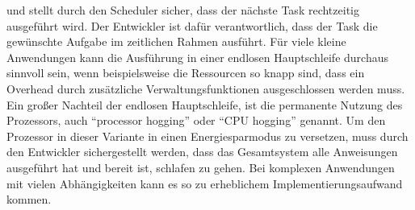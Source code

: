 und stellt durch den Scheduler sicher, dass der näch\-ste Task rechtzeitig ausgeführt wird. Der Entwickler ist dafür verantwortlich, dass der Task die ge\-wün\-schte Aufgabe im zeitlichen Rahmen ausführt. 
Für viele kleine Anwendungen kann die Ausführung in einer endlosen Hauptschleife durchaus sinnvoll sein, wenn beispielsweise die Ressourcen so knapp sind, dass ein Overhead durch zusätzliche Verwaltungsfunktionen ausgeschlossen werden muss. Ein großer Nachteil der endlosen Hauptschleife, ist die permanente Nutzung des Prozessors, auch "`processor hogging"' oder "`CPU hogging"' genannt. Um den Prozessor in dieser Variante in einen Energiesparmodus zu versetzen, muss durch den Entwickler sichergestellt werden, dass das Gesamtsystem alle Anweisungen ausgeführt hat und bereit ist, schlafen zu gehen. Bei komplexen Anwendungen mit vielen Ab\-häng\-ig\-kei\-ten kann es so zu erheblichem Implementierungsaufwand kommen.
